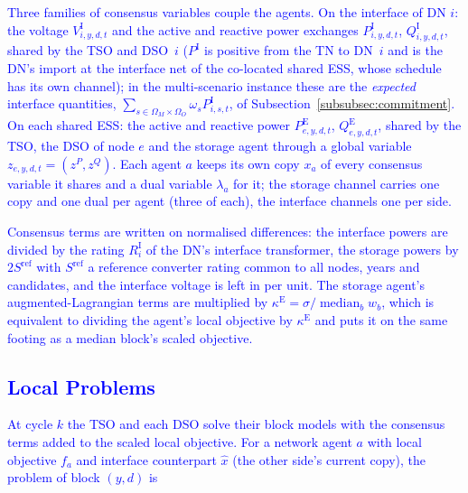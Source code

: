 \documentclass[preprint,12pt]{elsarticle}
\begin{document}
\textcolor{blue}{
    Three families of consensus variables couple the agents. On the interface of DN $i$: the voltage $V^{\text{I}}_{i,y,d,t}$ and the active and reactive power exchanges $P^{\text{I}}_{i,y,d,t}$, $Q^{\text{I}}_{i,y,d,t}$, shared by the TSO and DSO~$i$ ($P^{\text{I}}$ is positive from the TN to DN~$i$ and is the DN's import at the interface net of the co-located shared ESS, whose schedule has its own channel); in the multi-scenario instance these are the \emph{expected} interface quantities, $\sum_{s \in \Omega_M \times \Omega_O} \omega_s P^{\text{I}}_{i,s,t}$, of Subsection~\ref{subsubsec:commitment}. On each shared ESS: the active and reactive power $P^{\text{E}}_{e,y,d,t}$, $Q^{\text{E}}_{e,y,d,t}$, shared by the TSO, the DSO of node $e$ and the storage agent through a global variable $z_{e,y,d,t} = (z^{P}, z^{Q})$. Each agent $a$ keeps its own copy $x_a$ of every consensus variable it shares and a dual variable $\lambda_a$ for it; the storage channel carries one copy and one dual per agent (three of each), the interface channels one per side.
}

\textcolor{blue}{
    Consensus terms are written on normalised differences: the interface powers are divided by the rating $R^{\text{I}}_i$ of the DN's interface transformer, the storage powers by $2 S^{\text{ref}}$ with $S^{\text{ref}}$ a reference converter rating common to all nodes, years and candidates, and the interface voltage is left in per unit.
    The storage agent's augmented-Lagrangian terms are multiplied by $\kappa^{\text{E}} = \sigma / \operatorname{median}_b w_b$, which is equivalent to dividing the agent's local objective by $\kappa^{\text{E}}$ and puts it on the same footing as a median block's scaled objective.
}

\subsection{\textcolor{blue}{Local Problems}}
\label{app:admm_updated_implementation}

\textcolor{blue}{At cycle $k$ the TSO and each DSO solve their block models with the consensus terms added to the
scaled local objective. For a network agent $a$ with local objective $f_a$ and interface counterpart $\hat{x}$ (the
other side's current copy), the problem of block $(y,d)$ is}
\end{document}

